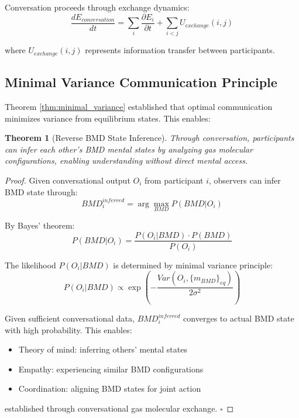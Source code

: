 \documentclass[12pt]{article}
\newtheorem{theorem}{Theorem}[section]
\theoremstyle{definition}
\theoremstyle{remark}
\begin{document}
Conversation proceeds through exchange dynamics:
\begin{equation}
\frac{dE_{conversation}}{dt} = \sum_i \frac{\partial E_i}{\partial t} + \sum_{i<j} U_{exchange}(i,j)
\end{equation}

where $U_{exchange}(i,j)$ represents information transfer between participants.

\subsection{Minimal Variance Communication Principle}

Theorem \ref{thm:minimal_variance} established that optimal communication minimizes variance from equilibrium states. This enables:

\begin{theorem}[Reverse BMD State Inference]
\label{thm:reverse_bmd}
Through conversation, participants can infer each other's BMD mental states by analyzing gas molecular configurations, enabling understanding without direct mental access.
\end{theorem}

\begin{proof}
Given conversational output $O_i$ from participant $i$, observers can infer BMD state through:
\begin{equation}
BMD_i^{inferred} = \arg\max_{BMD} P(BMD | O_i)
\end{equation}

By Bayes' theorem:
\begin{equation}
P(BMD | O_i) = \frac{P(O_i | BMD) \cdot P(BMD)}{P(O_i)}
\end{equation}

The likelihood $P(O_i | BMD)$ is determined by minimal variance principle:
\begin{equation}
P(O_i | BMD) \propto \exp\left(-\frac{Var(O_i, \{m_{BMD}\}_{eq})}{2\sigma^2}\right)
\end{equation}

Given sufficient conversational data, $BMD_i^{inferred}$ converges to actual BMD state with high probability. This enables:
\begin{itemize}
\item Theory of mind: inferring others' mental states
\item Empathy: experiencing similar BMD configurations
\item Coordination: aligning BMD states for joint action
\end{itemize}

established through conversational gas molecular exchange. $\square$
\end{proof}
\end{document}
